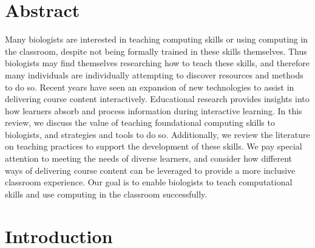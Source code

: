 

\section{Abstract}\label{sect:Abstract}

Many biologists are interested in teaching computing skills or using computing in the classroom, despite not being formally trained in these skills themselves.
Thus biologists may find themselves researching how to teach these skills,
and therefore many individuals are individually attempting to discover resources and methods to do so.
Recent years have seen an expansion of new technologies to assist in delivering course content interactively.
Educational research provides insights into how learners absorb and process information during interactive learning.
In this review, we discuss the value of teaching foundational computing skills to biologists, and 
strategies and tools to do so.
Additionally, we review the literature on teaching practices to support the development of these skills.
We pay special attention to meeting the needs of diverse learners, and consider how different ways of delivering course content can be leveraged to provide a more inclusive classroom experience.
Our goal is to enable biologists to teach computational skills and use computing in the classroom successfully.

\bigskip


\bigskip
\section{Introduction}\label{sect:Introduction}

